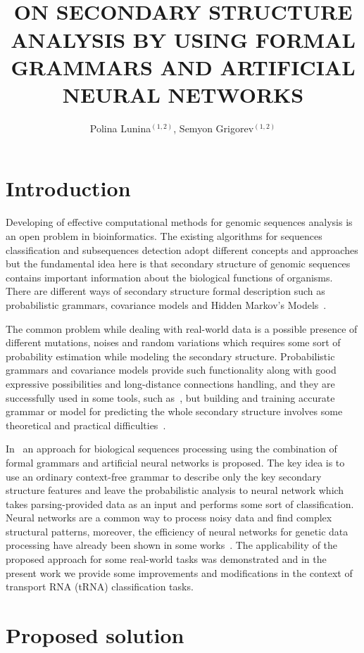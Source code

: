 \documentclass[12pt,a4paper]{cibb}
\title{\large $\ $\\ \bf ON SECONDARY STRUCTURE ANALYSIS BY USING FORMAL GRAMMARS AND ARTIFICIAL NEURAL NETWORKS}
\author{ Polina Lunina$^{(1,2)}$, Semyon Grigorev$^{(1,2)}$}
\begin{document}
\thispagestyle{myheadings}
\pagestyle{myheadings}



\section{\bf Introduction}

Developing of effective computational methods for genomic sequences analysis is an open problem in bioinformatics.
The existing algorithms for sequences classification and subsequences detection adopt different concepts and approaches but the fundamental idea here is that secondary structure of genomic sequences contains important information about the biological functions of organisms.
There are different ways of secondary structure formal description such as probabilistic grammars, covariance models and Hidden Markov’s Models~\cite{EddyDurbin,!!!}. 

The common problem while dealing with real-world data is a possible presence of different mutations, noises and random variations which requires some sort of probability estimation while modeling the secondary structure.
Probabilistic grammars and covariance models provide such functionality along with good expressive possibilities and long-distance connections handling, and they are successfully used in some tools, such as~\cite{Infernal}, but building and training accurate grammar or model for predicting the whole secondary structure involves some theoretical and practical difficulties~\cite{!!!}.

In~\cite{grigorevcomposition} an approach for biological sequences processing using the combination of formal grammars and artificial neural networks is proposed.
The key idea is to use an ordinary context-free grammar to describe only the key secondary structure features and leave the probabilistic analysis to neural network which takes parsing-provided data as an input and performs some sort of classification.
Neural networks are a common way to process noisy data and find complex structural patterns, moreover, the efficiency of neural networks for genetic data processing have already been shown in some works~\cite{Humidor,ANN}.
The applicability of the proposed approach for some real-world tasks was demonstrated and in the present work we provide some improvements and modifications in the context of transport RNA (tRNA) classification tasks. 

\section{\bf Proposed solution}
\end{document}
